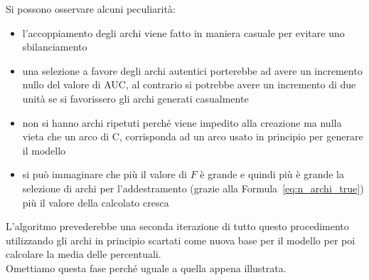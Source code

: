 Si possono osservare alcuni peculiarità:
\begin{itemize}
	\item l'accoppiamento degli archi viene fatto in maniera casuale per evitare uno sbilanciamento
	\item una selezione a favore degli archi autentici porterebbe ad avere un incremento nullo del valore di AUC, al contrario si potrebbe avere un incremento di due unità se si favorissero  gli archi generati casualmente
	\item non si hanno archi ripetuti perché viene impedito alla creazione ma nulla vieta che un arco di C, corrisponda ad un arco usato in principio per generare il modello
	\item si può immaginare che più il valore di $F$ è grande e quindi più è grande la selezione di archi per l'addestramento (grazie alla Formula~\ref{eq:n_archi_true}) più il valore della calcolato cresca
\end{itemize}
L'algoritmo prevederebbe una seconda iterazione di tutto questo procedimento utilizzando gli archi in principio scartati come nuova base per il modello per poi calcolare la media delle percentuali.\\ Omettiamo questa fase perché uguale a quella appena illustrata.
%
